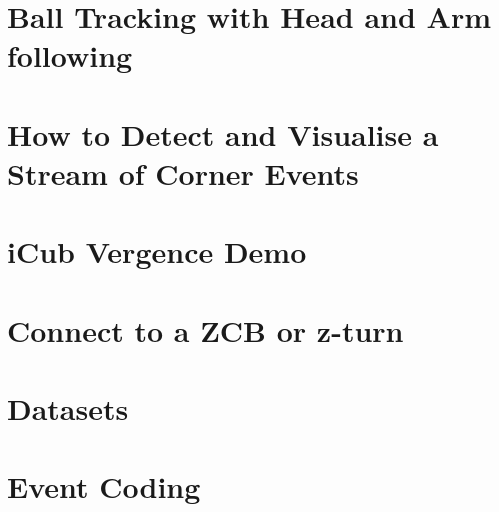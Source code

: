 \documentclass[twoside]{book}
\newcommand{\+}{\discretionary{\mbox{\scriptsize$\hookleftarrow$}}{}{}}
\begin{document}
\chapter{Ball Tracking with Head and Arm following}
\label{md__mnt_d_projects_event-driven_documentation_application_instructions_4balldemo}

\chapter{How to Detect and Visualise a Stream of Corner Events}
\label{md__mnt_d_projects_event-driven_documentation_application_instructions_5corners}

\chapter{i\+Cub Vergence Demo}
\label{md__mnt_d_projects_event-driven_documentation_application_instructions_6vergence}

\chapter{Connect to a Z\+CB or z-\/turn}
\label{md__mnt_d_projects_event-driven_documentation_connect_to_zcb}

\chapter{Datasets}
\label{md__mnt_d_projects_event-driven_documentation_datasets}

\chapter{Event Coding}
\label{md__mnt_d_projects_event-driven_documentation_eventcodecs}

\end{document}
